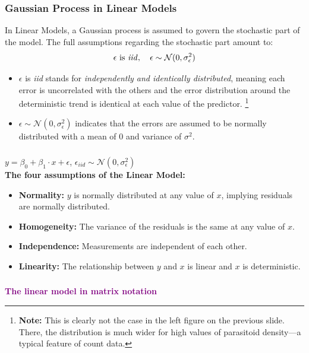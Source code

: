 \documentclass{beamer}
\begin{document}
\begin{frame}
    \frametitle{Gaussian Process in Linear Models}
    In Linear Models, a Gaussian process is assumed to govern the stochastic part of the model. The full assumptions regarding the stochastic part amount to:
    \begin{equation*}
        \epsilon \text{ is \textit{iid}}, \quad \epsilon \sim \mathcal{N}(0, \sigma^2_{\epsilon})
    \end{equation*}
    \begin{itemize}
        \item $\epsilon$ is \textit{iid} stands for \textit{independently and identically distributed}, meaning each error is uncorrelated with the others and the error distribution around the deterministic trend is identical at each value of the predictor. \footnote{\textbf{Note:} This is clearly not the case in the left figure on the previous slide. There, the distribution is much wider for high values of parasitoid density—a typical feature of count data.} 
        \item $\epsilon \sim \mathcal{N}(0, \sigma^2_{\epsilon})$ indicates that the errors are assumed to be normally distributed with a mean of 0 and variance of $\sigma^2$. 
    \end{itemize}
\end{frame}

\begin{frame}
    \frametitle{}
    $y = \beta_0 + \beta_1 \cdot x + \epsilon$, $\epsilon_{iid} \sim \mathcal{N}(0, \sigma^2_{\epsilon})$ \\
    \vspace{0.5cm}
    \textbf{The four assumptions of the Linear Model:}
    \begin{itemize}
        \item \textbf{Normality:} $y$ is normally distributed at any value of $x$, implying residuals are normally distributed.
        \item \textbf{Homogeneity:} The variance of the residuals is the same at any value of $x$.
        \item \textbf{Independence:} Measurements are independent of each other.
        \item \textbf{Linearity:} The relationship between $y$ and $x$ is linear and $x$ is deterministic.
    \end{itemize}
    
\end{frame}

\begin{frame}
    \frametitle{}
    \begin{center}
        \huge\textbf{\textcolor{purple}{The linear model in matrix notation}}
    \end{center}
\end{frame}
\end{document}
